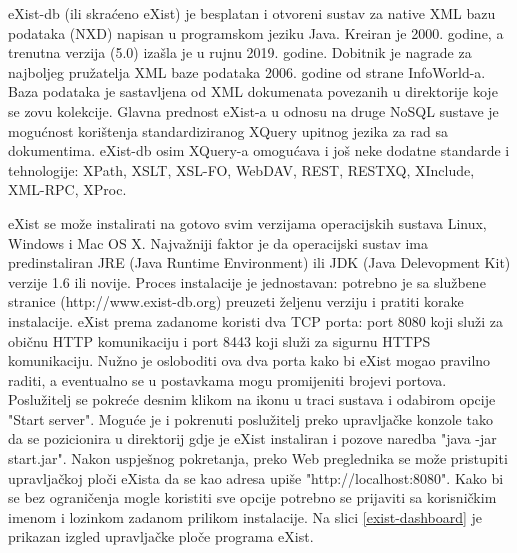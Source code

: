 \documentclass{foi}
\begin{document}
eXist-db (ili skraćeno eXist) je besplatan i otvoreni sustav za native XML bazu podataka (NXD) napisan u programskom jeziku Java. Kreiran je 2000. godine, a trenutna verzija (5.0) izašla je u rujnu 2019. godine. Dobitnik je nagrade za najboljeg pružatelja XML baze podataka 2006. godine od strane InfoWorld-a. Baza podataka je sastavljena od XML dokumenata povezanih u direktorije koje se zovu kolekcije. Glavna prednost eXist-a u odnosu na druge NoSQL sustave je mogućnost korištenja standardiziranog XQuery upitnog jezika za rad sa dokumentima. eXist-db osim XQuery-a omogućava i još neke dodatne standarde i tehnologije: XPath, XSLT, XSL-FO, WebDAV, REST, RESTXQ, XInclude, XML-RPC, XProc. \cite{exist-definition}

eXist se može instalirati na gotovo svim verzijama operacijskih sustava Linux, Windows i Mac OS X. Najvažniji faktor je da operacijski sustav ima predinstaliran JRE (Java Runtime Environment) ili JDK (Java Delevopment Kit) verzije 1.6 ili novije. Proces instalacije je jednostavan: potrebno je sa službene stranice (http://www.exist-db.org) preuzeti željenu verziju i pratiti korake instalacije. eXist prema zadanome koristi dva TCP porta: port 8080 koji služi za običnu HTTP komunikaciju i port 8443 koji služi za sigurnu HTTPS komunikaciju. Nužno je osloboditi ova dva porta kako bi eXist mogao pravilno raditi, a eventualno se u postavkama mogu promijeniti brojevi portova. Poslužitelj se pokreće desnim klikom na ikonu u traci sustava i odabirom opcije "Start server". Moguće je i pokrenuti poslužitelj preko upravljačke konzole tako da se pozicionira u direktorij gdje je eXist instaliran i pozove naredba "java -jar start.jar". Nakon uspješnog pokretanja, preko Web preglednika se može pristupiti upravljačkoj ploči eXista da se kao adresa upiše "http://localhost:8080". Kako bi se bez ograničenja mogle koristiti sve opcije potrebno se prijaviti sa korisničkim imenom i lozinkom zadanom prilikom instalacije. Na slici \ref{exist-dashboard} je prikazan izgled upravljačke ploče programa eXist.
\end{document}
